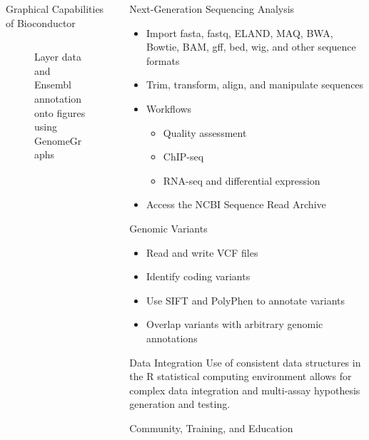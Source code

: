 \documentclass[final]{beamer}
\begin{document}
\begin{frame}[t]
\begin{columns}[t]
\begin{column}{0.48\linewidth}
\begin{block}{Graphical Capabilities of Bioconductor}
\begin{columns}[t]
\begin{column}{0.33\linewidth}
\begin{figure}
              \caption{Layer data and Ensembl annotation onto figures using GenomeGraphs}
            \end{figure}
          \end{column}
        \end{columns}
      \end{block}

 \end{column}
    \begin{column}{0.24\linewidth}
      \begin{block}{Next-Generation Sequencing Analysis}
        \begin{itemize}
          \item{Import fasta, fastq, ELAND, MAQ, BWA, Bowtie, BAM, gff, bed, wig, and other sequence formats} 
          \item{Trim, transform, align, and manipulate sequences}
          \item{Workflows}
            \begin{itemize}
              \item{Quality assessment}
              \item{ChIP-seq}
              \item{RNA-seq and differential expression}
            \end{itemize}
          \item{Access the NCBI Sequence Read Archive}
        \end{itemize}
      \end{block}
      \begin{block}{Genomic Variants}
        \begin{itemize}
          \item{Read and write VCF files}
          \item{Identify coding variants}
          \item{Use SIFT and PolyPhen to annotate variants}
          \item{Overlap variants with arbitrary genomic annotations}
        \end{itemize}
      \end{block}
      \begin{block}{Data Integration}
        Use of consistent data structures in the R statistical computing environment allows for complex data integration and multi-assay hypothesis generation and testing.
      \end{block}
      \begin{block}{Community, Training, and Education}

\end{block}
\end{column}
\end{columns}
\end{frame}
\end{document}
